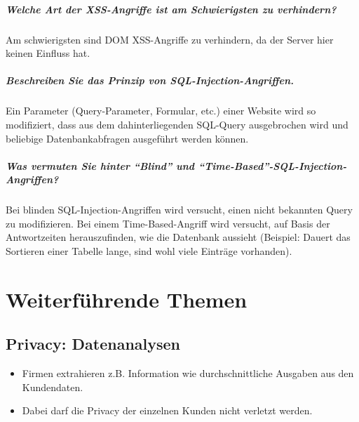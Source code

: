 \documentclass[a4paper, 11pt, accentcolor = tud3b]{tudreport}
\begin{document}
			\paragraph{Welche Art der XSS-Angriffe ist am Schwierigsten zu verhindern?}
			Am schwierigsten sind DOM XSS-Angriffe zu verhindern, da der Server hier keinen Einfluss hat.
			
			\paragraph{Beschreiben Sie das Prinzip von SQL-Injection-Angriffen.}
			Ein Parameter (Query-Parameter, Formular, etc.) einer Website wird so modifiziert, dass aus dem dahinterliegenden SQL-Query ausgebrochen wird und beliebige Datenbankabfragen ausgeführt werden können.
			
			\paragraph{Was vermuten Sie hinter \enquote{Blind} und \enquote{Time-Based}-SQL-Injection-Angriffen?}
			Bei blinden SQL-Injection-Angriffen wird versucht, einen nicht bekannten Query zu modifizieren. Bei einem Time-Based-Angriff wird versucht, auf Basis der Antwortzeiten herauszufinden, wie die Datenbank aussieht (Beispiel: Dauert das Sortieren einer Tabelle lange, sind wohl viele Einträge vorhanden).

    \chapter{Weiterführende Themen}
        \section{Privacy: Datenanalysen}
            \begin{itemize}
            	\item Firmen extrahieren z.B. Information wie durchschnittliche Ausgaben aus den Kundendaten.
            	\item Dabei darf die Privacy der einzelnen Kunden nicht verletzt werden.
            \end{itemize}
\end{document}
